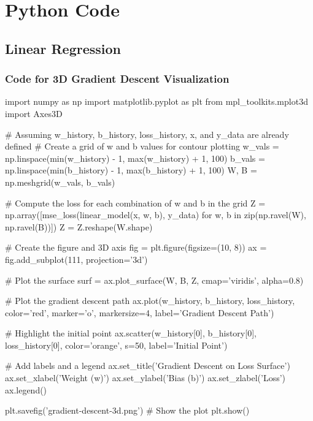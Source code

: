 %
%
%

\appendix
\chapter{Python Code}
\label{introA} %

\section{Linear Regression}

\subsection{Code for 3D Gradient Descent Visualization}
\label{sec:gradient-descent-3d}
\begin{codeblock}
import numpy as np
import matplotlib.pyplot as plt
from mpl_toolkits.mplot3d import Axes3D

# Assuming w_history, b_history, loss_history, x, and y_data are already defined
# Create a grid of w and b values for contour plotting
w_vals = np.linspace(min(w_history) - 1, max(w_history) + 1, 100)
b_vals = np.linspace(min(b_history) - 1, max(b_history) + 1, 100)
W, B = np.meshgrid(w_vals, b_vals)

# Compute the loss for each combination of w and b in the grid
Z = np.array([mse_loss(linear_model(x, w, b), y_data) for w, b in zip(np.ravel(W), np.ravel(B))])
Z = Z.reshape(W.shape)

# Create the figure and 3D axis
fig = plt.figure(figsize=(10, 8))
ax = fig.add_subplot(111, projection='3d')

# Plot the surface
surf = ax.plot_surface(W, B, Z, cmap='viridis', alpha=0.8)

# Plot the gradient descent path
ax.plot(w_history, b_history, loss_history, color='red', marker='o', markersize=4, label='Gradient Descent Path')

# Highlight the initial point
ax.scatter(w_history[0], b_history[0], loss_history[0], color='orange', s=50, label='Initial Point')

# Add labels and a legend
ax.set_title('Gradient Descent on Loss Surface')
ax.set_xlabel('Weight (w)')
ax.set_ylabel('Bias (b)')
ax.set_zlabel('Loss')
ax.legend()

plt.savefig('gradient-descent-3d.png')
# Show the plot
plt.show()

\end{codeblock}

